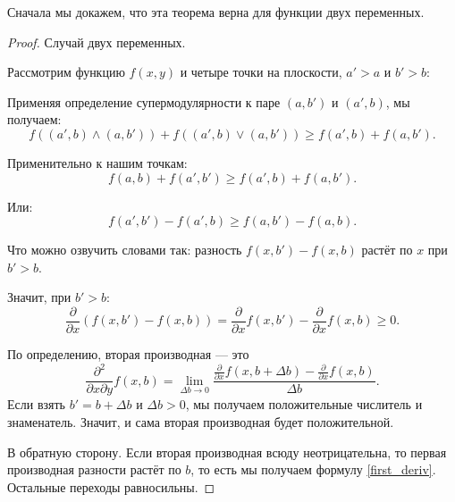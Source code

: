 Сначала мы докажем, что эта теорема верна для функции двух переменных.
\begin{proof} Случай двух переменных.

Рассмотрим функцию $ f(x,y) $ и четыре точки на плоскости, $ a'>a $ и $ b'>b $:



Применяя определение супермодулярности к паре $ (a,b') $ и $ (a',b) $, мы получаем:
\begin{equation}
f((a',b)\wedge(a,b')) + f((a',b)\vee(a,b'))\geq f(a',b) + f(a,b').
\end{equation}

Применительно к нашим точкам:
\begin{equation}
f(a,b)+f(a',b')\geq f(a',b)+f(a,b').
\end{equation}

Или:
\begin{equation}
f(a',b')-f(a',b)\geq f(a,b')-f(a,b).
\end{equation}

Что можно озвучить словами так: разность $ f(x,b')-f(x,b) $ растёт по $ x $ при $ b'>b $.


Значит, при $ b'>b $:
\begin{equation}\label{first_deriv}
\frac{\partial }{\partial x}(f(x,b')-f(x,b))=\frac{\partial }{\partial x}f(x,b')-\frac{\partial }{\partial x} f(x,b) \geq 0.
\end{equation}

По определению, вторая производная — это
\begin{equation}
\frac{\partial^{2}}{\partial x \partial y}f(x,b)=\lim_{\Delta b\to 0}\frac{\frac{\partial }{\partial x}f(x,b+\Delta b)-\frac{\partial }{\partial x} f(x,b)}{\Delta b}.
\end{equation}
Если взять $ b'=b+\Delta b $ и $ \Delta b>0 $, мы получаем положительные числитель и знаменатель. Значит, и сама вторая производная будет положительной.

В обратную сторону. Если вторая производная всюду неотрицательна, то первая производная разности растёт по $ b $, то есть мы получаем формулу \ref{first_deriv}. Остальные переходы равносильны.

\end{proof}


